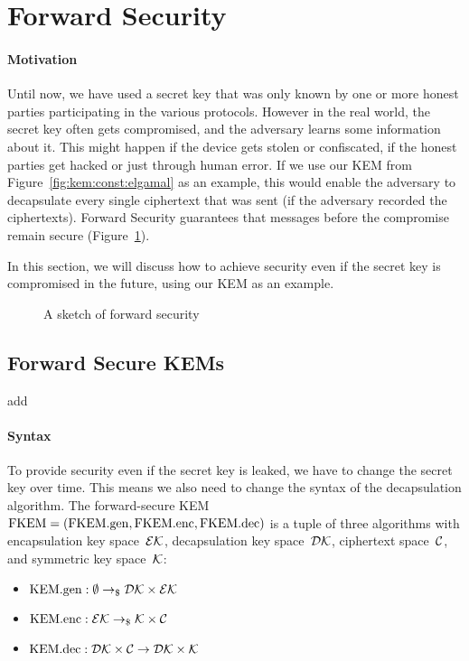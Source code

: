 \section{Forward Security}
\label{sec:forward-sec}

\paragraph{Motivation} Until now, we have used a secret key that was only known by one or more honest parties participating in the various protocols.
However in the real world, the secret key often gets compromised, and the adversary learns some information about it.
This might happen if the device gets stolen or confiscated, if the honest parties get hacked or just through human error.
If we use our KEM from Figure~\ref{fig:kem:const:elgamal} as an example, this would enable the adversary to decapsulate every single ciphertext that was sent (if the adversary recorded the ciphertexts).
Forward Security guarantees that messages before the compromise remain secure (Figure~\ref{fig:fs:sketch}).

In this section, we will discuss how to achieve security even if the secret key is compromised in the future, using our KEM as an example.

\begin{figure}[!ht]
    \centering
    
    \caption{A sketch of forward security}
    \label{fig:fs:sketch}
\end{figure}

\subsection{Forward Secure KEMs}

\alert{add \cite{SP:GreMie15,EC:CanHalKat03,EC:GHJL17}}

\paragraph{Syntax} To provide security even if the secret key is leaked, we have to change the secret key over time.
This means we also need to change the syntax of the decapsulation algorithm.
The forward-secure KEM $\mathrm{FKEM}=(\mathrm{FKEM}.\mathrm{gen},\mathrm{FKEM}.\mathrm{enc},\mathrm{FKEM}.\mathrm{dec})$ is a tuple of three algorithms with encapsulation key space~$\mathcal{EK}$, decapsulation key space~$\mathcal{DK}$, ciphertext space~$\mathcal{C}$, and symmetric key space~$\mathcal{K}$:
\begin{itemize}
    \item $\mathrm{KEM}.\mathrm{gen}: \emptyset \to_\$ \mathcal{DK}\times\mathcal{EK}$
    \item $\mathrm{KEM}.\mathrm{enc}: \mathcal{EK} \to_\$ \mathcal{K}\times\mathcal{C}$
    \item $\mathrm{KEM}.\mathrm{dec}: \mathcal{DK}\times\mathcal{C} \to \mathcal{DK}\times\mathcal{K}$
\end{itemize}

